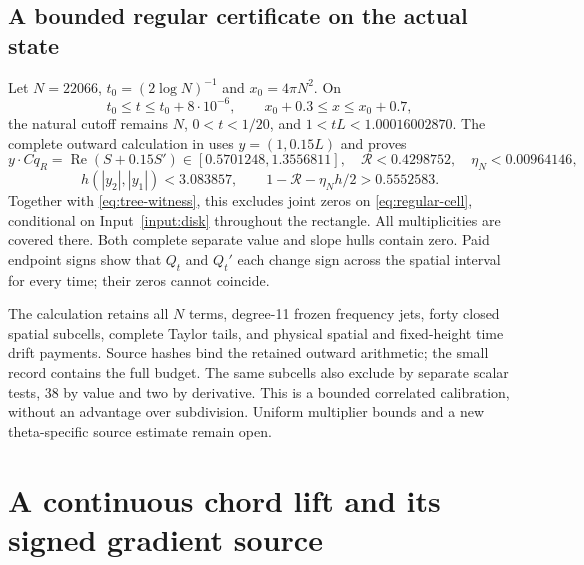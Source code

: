 \documentclass[11pt]{article}
\theoremstyle{definition}
\theoremstyle{remark}
\newcommand{\Rea}{\operatorname{Re}}
\begin{document}
\subsection{A bounded regular certificate on the actual state}
\label{sec:regular-cell}

Let $N=22066$, $t_0=(2\log N)^{-1}$ and $x_0=4\pi N^2$. On
\begin{equation}
 t_0\le t\le t_0+8\cdot10^{-6},\qquad
 x_0+0.3\le x\le x_0+0.7,
 \label{eq:regular-cell}
\end{equation}
the natural cutoff remains $N$, $0<t<1/20$, and $1<tL<1.00016002870$.
The complete outward calculation in \cite{transportcontinuation} uses
$y=(1,0.15L)$ and proves
\[
 y\cdot Cq_R=\Rea(S+0.15S')\in[0.5701248,1.3556811],\quad
 \mathcal R<0.4298752,\quad \eta_N<0.00964146,
\]
\[
 h(|y_2|,|y_1|)<3.083857,\qquad
 1-\mathcal R-\eta_N h/2>0.5552583.
\]
Together with \eqref{eq:tree-witness}, this excludes joint zeros on
\eqref{eq:regular-cell}, conditional on Input~\ref{input:disk}
throughout the rectangle. All multiplicities are covered there.
Both complete separate value and slope hulls contain zero. Paid endpoint
signs show that $Q_t$ and $Q_t'$ each change sign across the spatial
interval for every time; their zeros cannot coincide.

The calculation retains all $N$ terms, degree-11 frozen frequency jets,
forty closed spatial subcells, complete Taylor tails, and physical spatial
and fixed-height time drift payments. Source hashes bind the retained
outward arithmetic; the small record contains the full budget. The same
subcells also exclude by separate scalar tests, 38 by value and two by
derivative. This is a bounded correlated calibration, without an
advantage over subdivision. Uniform multiplier bounds and a new
theta-specific source estimate remain open.

\section{A continuous chord lift and its signed gradient source}
\label{sec:chord}
\end{document}

